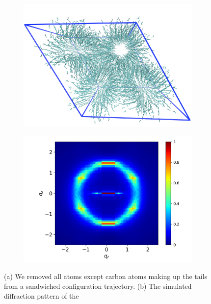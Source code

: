 \documentclass{article}
\begin{document}
  \begin{figure}
	\centering
	\begin{subfigure}{0.45\linewidth}
		\centering
		\includegraphics[width=\textwidth]{tails_topview.png}  %
		\caption{}\label{fig:topdown_tails_only}
	\end{subfigure}
	\begin{subfigure}{0.45\linewidth}
		\centering
		\includegraphics[width=\textwidth]{tails_rzplot.png}
		\caption{}\label{fig:tails_rzplot}
	\end{subfigure}
	\caption{(a) We removed all atoms except carbon atoms making up the tails from a 
	sandwiched configuration trajectory. (b) The simulated diffraction pattern of the
}
\end{figure}
\end{document}
